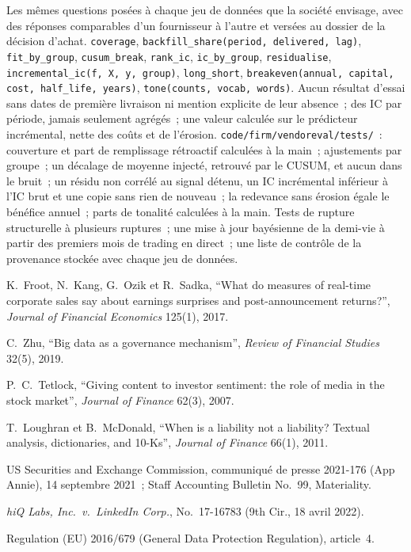 \begin{build}
 Les mêmes questions posées à chaque jeu de données que la société envisage, avec des réponses comparables
d'un fournisseur à l'autre et versées au dossier de la décision d'achat.
 \texttt{coverage}, \texttt{backfill\_share(period, delivered, lag)}, \texttt{fit\_by\_group}, \texttt{cusum\_break},
\texttt{rank\_ic}, \texttt{ic\_by\_group}, \texttt{residualise}, \texttt{incremental\_ic(f, X, y, group)}, \texttt{long\_short},
\texttt{breakeven(annual, capital, cost, half\_life, years)}, \texttt{tone(counts, vocab, words)}.
 Aucun résultat d'essai sans dates de première livraison ni mention explicite de leur absence~; des IC par période, jamais seulement agrégés~;
une valeur calculée sur le prédicteur incrémental, nette des coûts et de l'érosion.
 \texttt{code/firm/vendoreval/tests/}~: couverture et part de remplissage rétroactif calculées à la main~; ajustements par groupe~; un décalage de moyenne injecté, retrouvé par
le CUSUM, et aucun dans le bruit~; un résidu non corrélé au signal détenu, un IC incrémental inférieur à l'IC brut et une copie sans rien de nouveau~; la
redevance sans érosion égale le bénéfice annuel~; parts de tonalité calculées à la main.
 Tests de rupture structurelle à plusieurs ruptures~; une mise à jour bayésienne de la demi-vie à partir des premiers mois de trading en direct~; une
liste de contrôle de la provenance stockée avec chaque jeu de données.
\end{build}

\begin{omsources}
\item K.~Froot, N.~Kang, G.~Ozik et R.~Sadka, ``What do measures of real-time corporate sales say about earnings surprises and post-announcement
returns?'', \emph{Journal of Financial Economics} 125(1), 2017.
\item C.~Zhu, ``Big data as a governance mechanism'', \emph{Review of Financial Studies} 32(5), 2019.
\item P.~C.~Tetlock, ``Giving content to investor sentiment: the role of media in the stock market'', \emph{Journal of Finance} 62(3), 2007.
\item T.~Loughran et B.~McDonald, ``When is a liability not a liability? Textual analysis, dictionaries, and 10-Ks'', \emph{Journal of Finance}
66(1), 2011.
\item US Securities and Exchange Commission, communiqué de presse 2021-176 (App Annie), 14 septembre 2021~; Staff Accounting Bulletin No.~99,
Materiality.
\item \emph{hiQ Labs, Inc.\ v.\ LinkedIn Corp.}, No.~17-16783 (9th Cir., 18 avril 2022).
\item Regulation (EU) 2016/679 (General Data Protection Regulation), article~4.
\end{omsources}

